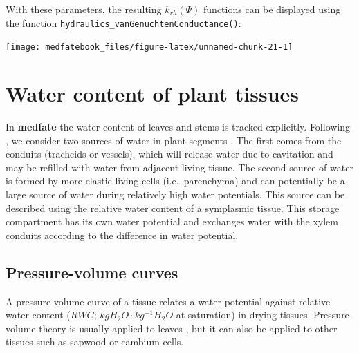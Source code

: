 \documentclass[]{book}
\begin{document}
With these parameters, the resulting \(k_{rh}(\Psi)\) functions can be displayed using the function \texttt{hydraulics\_vanGenuchtenConductance()}:

\begin{center}\texttt{[image: medfatebook\_files/figure-latex/unnamed-chunk-21-1]} \end{center}

\hypertarget{water-content-of-plant-tissues}{%
\section{Water content of plant tissues}\label{water-content-of-plant-tissues}}

In \textbf{medfate} the water content of leaves and stems is tracked explicitly. Following \citet{Martin-StPaul2017}, we consider two sources of water in plant segments \citep{Tyree1990}. The first comes from the conduits (tracheids or vessels), which will release water due to cavitation and may be refilled with water from adjacent living tissue. The second source of water is formed by more elastic living cells (i.e.~parenchyma) and can potentially be a large source of water during relatively high water potentials. This source can be described using the relative water content of a symplasmic tissue. This storage compartment has its own water potential and exchanges water with the xylem conduits according to the difference in water potential.

\hypertarget{pressure-volume-curves}{%
\subsection{Pressure-volume curves}\label{pressure-volume-curves}}

A pressure-volume curve of a tissue relates a water potential against relative water content (\(RWC\); \(kg H_2O \cdot kg^{-1}H_2O\) at saturation) in drying tissues. Pressure-volume theory is usually applied to leaves \citep{Bartlett2012}, but it can also be applied to other tissues such as sapwood or cambium cells.
\end{document}
